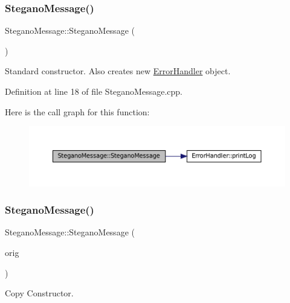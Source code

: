 \subsubsection{\texorpdfstring{SteganoMessage()}{SteganoMessage()}\hspace{0.1cm}{\footnotesize\ttfamily [1/2]}}
{\footnotesize\ttfamily Stegano\+Message\+::\+Stegano\+Message (\begin{DoxyParamCaption}{ }\end{DoxyParamCaption})}



Standard constructor. Also creates new \mbox{\hyperlink{classErrorHandler}{Error\+Handler}} object. 



Definition at line 18 of file Stegano\+Message.\+cpp.

Here is the call graph for this function\+:\nopagebreak
\begin{figure}[H]
\begin{center}
\leavevmode
\includegraphics[width=350pt]{classSteganoMessage_a7a14cbd03ebca6764f8b234f8dcd1697_cgraph}
\end{center}
\end{figure}
\mbox{\label{classSteganoMessage_a67a8a4a8aae12db32bb758e6cd44b16a}} 
\subsubsection{\texorpdfstring{SteganoMessage()}{SteganoMessage()}\hspace{0.1cm}{\footnotesize\ttfamily [2/2]}}
{\footnotesize\ttfamily Stegano\+Message\+::\+Stegano\+Message (\begin{DoxyParamCaption}\item[{const \mbox{\hyperlink{classSteganoMessage}{Stegano\+Message}} \&}]{orig }\end{DoxyParamCaption})}



Copy Constructor. 


